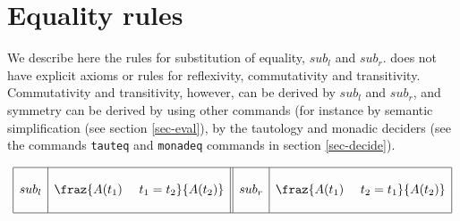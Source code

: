 \section{Equality rules}

We describe here the rules for substitution of equality, $sub_l$ and $sub_r$.
{\GF} does not have explicit axioms or rules for reflexivity, commutativity and
transitivity.
Commutativity and transitivity, however, can be derived by $sub_l$ and $sub_r$,
and symmetry can be derived by using other {\GF} commands (for instance by
semantic simplification (see section \ref{sec-eval}), by the tautology and
monadic deciders (see the commands {\tt tauteq} and {\tt monadeq} commands in
section \ref{sec-decide}).


\[
\begin{array}{|c|c||c|c|} \hline 
	&&& \\
	sub_l &
	\fraz{A(t_1) \ \ \ \ t_1 = t_2}
	     {A(t_2)}
	&
	sub_r &
	\fraz{A(t_1) \ \ \ \ t_2 = t_1}
	     {A(t_2)}
	\\
	&&& \\ \hline
\end{array}
\]
